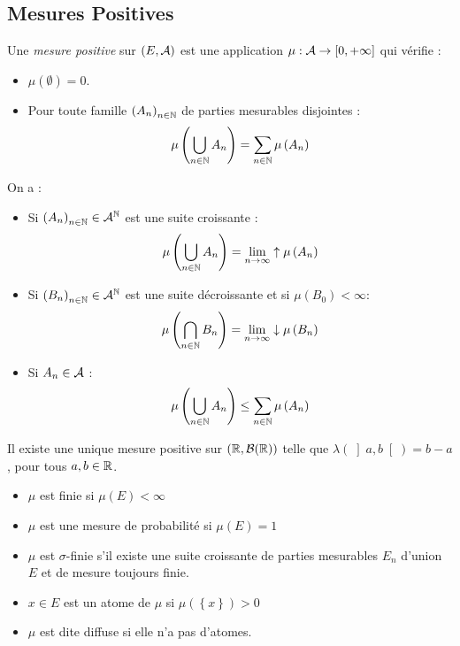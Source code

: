 \documentclass{cours}
\begin{document}
\subsection{Mesures Positives}

\begin{definition}
    Une \emph{mesure positive} sur $\left(E, \mathcal{A}\right)$ est une application $\mu : \mathcal{A} \rightarrow \left[0, +\infty\right]$ qui vérifie :
    \begin{itemize}
        \item $\mu(\emptyset) = 0$.
        \item Pour toute famille $\left(A_{n}\right)_{n \in \mathbb{N}}$ de parties mesurables disjointes : \[\mu\left(\bigcup_{n \in \mathbb{N}}A_{n}\right) = \sum_{n \in \mathbb{N}} \mu\left(A_{n}\right)\]
    \end{itemize}
\end{definition}



\begin{proposition}
    On a :
    \begin{itemize}
        \item Si $\left(A_{n}\right)_{n\in \mathbb{N}} \in \mathcal{A}^{\mathbb{N}}$ est une suite croissante :
              \[
                  \mu\left(\bigcup_{n\in \mathbb{N}}A_{n}\right) = \lim_{n\to \infty} \uparrow \mu\left(A_{n}\right)
              \]
        \item Si $\left(B_{n}\right)_{n\in \mathbb{N}} \in \mathcal{A}^{\mathbb{N}}$ est une suite décroissante et si $\mu\left(B_{0}\right) < \infty$:
              \[
                  \mu\left(\bigcap_{n\in \mathbb{N}}B_{n}\right) = \lim_{n\to \infty} \downarrow \mu\left(B_{n}\right)
              \]
        \item Si $A_{n} \in \mathcal{A}$ :
              \[
                  \mu\left(\bigcup_{n \in \mathbb{N}} A_{n}\right) \leq \sum_{n\in\mathbb{N}} \mu\left(A_{n}\right)
              \]
    \end{itemize}
\end{proposition}

\begin{definition}
    Il existe une unique mesure positive sur $\left(\mathbb{R}, \mathcal{B}(\mathbb{R})\right)$ telle que $\lambda(\left]a, b\right[) = b - a$, pour tous $a, b \in \mathbb{R}$.
\end{definition}

\begin{definition}
    \begin{itemize}
        \item $\mu$ est finie si $\mu\left(E\right)<\infty$
        \item $\mu$ est une mesure de probabilité si $\mu(E) = 1$
        \item $\mu$ est $\sigma$-finie s'il existe une suite croissante de parties mesurables $E_{n}$ d'union $E$ et de mesure toujours finie.
        \item $x \in E$ est un atome de $\mu$ si $\mu\left(\left\{x\right\}\right) > 0$
        \item $\mu$ est dite diffuse si elle n'a pas d'atomes.
    \end{itemize}
\end{definition}
\end{document}
